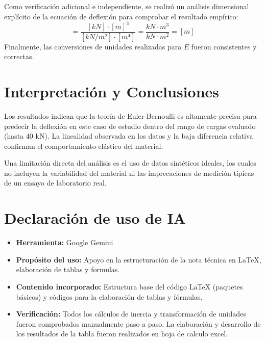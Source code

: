 \documentclass[11pt, a4paper]{article}
\begin{document}
Como verificación adicional e independiente, se realizó un análisis dimensional explícito de la ecuación de deflexión para comprobar el resultado empírico:
\begin{equation}
    [\delta_{teo}] = \frac{[kN] \cdot [m]^3}{[kN/m^2] \cdot [m^4]} = \frac{kN \cdot m^3}{kN \cdot m^2} = [m]
\end{equation}
Finalmente, las conversiones de unidades realizadas para $E$ fueron consistentes y correctas.

\section{Interpretación y Conclusiones}
Los resultados indican que la teoría de Euler-Bernoulli es altamente precisa para predecir la deflexión en este caso de estudio dentro del rango de cargas evaluado (hasta 40 kN). La linealidad observada en los datos y la baja diferencia relativa confirman el comportamiento elástico del material. 

Una limitación directa del análisis es el uso de datos sintéticos ideales, los cuales no incluyen la variabilidad del material ni las imprecaciones de medición típicas de un ensayo de laboratorio real.

\section{Declaración de uso de IA}
\begin{itemize}
    \item \textbf{Herramienta:} Google Gemini 
    \item \textbf{Propósito del uso:} Apoyo en la estructuración de la nota técnica en LaTeX, elaboración de tablas y formulas.
    \item \textbf{Contenido incorporado:} Estructura base del código LaTeX (paquetes básicos) y códigos para la elaboración de tablas y fórmulas.
    \item \textbf{Verificación:} Todos los cálculos de inercia y transformación de unidades fueron comprobados manualmente paso a paso. La elaboración y desarrollo de los resultados de la tabla fueron realizados en hoja de calculo excel.
\end{itemize}

\cite{hibbeler2017}


\end{document}
